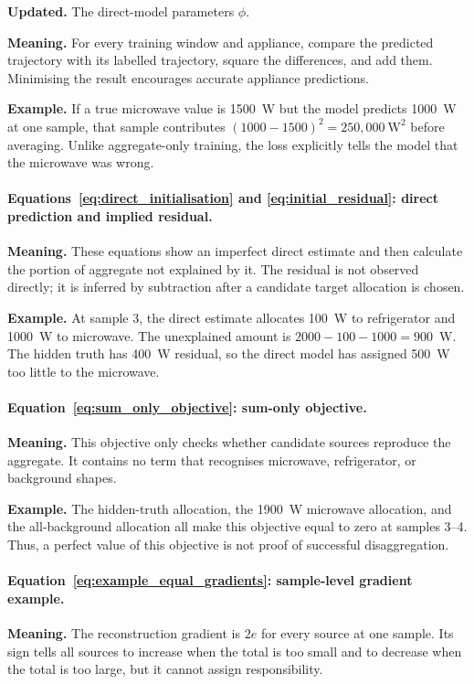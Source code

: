 \documentclass[11pt]{article}
\begin{document}
\textbf{Updated.} The direct-model parameters $\phi$.

\textbf{Meaning.} For every training window and appliance, compare the predicted trajectory with its labelled trajectory, square the differences, and add them. Minimising the result encourages accurate appliance predictions.

\textbf{Example.} If a true microwave value is 1500~W but the model predicts 1000~W at one sample, that sample contributes $(1000-1500)^2=250{,}000\ \mathrm{W}^2$ before averaging. Unlike aggregate-only training, the loss explicitly tells the model that the microwave was wrong.

\paragraph{Equations~\eqref{eq:direct_initialisation} and \eqref{eq:initial_residual}: direct prediction and implied residual.}
\textbf{Meaning.} These equations show an imperfect direct estimate and then calculate the portion of aggregate not explained by it. The residual is not observed directly; it is inferred by subtraction after a candidate target allocation is chosen.

\textbf{Example.} At sample 3, the direct estimate allocates 100~W to refrigerator and 1000~W to microwave. The unexplained amount is $2000-100-1000=900$~W. The hidden truth has 400~W residual, so the direct model has assigned 500~W too little to the microwave.

\paragraph{Equation~\eqref{eq:sum_only_objective}: sum-only objective.}
\textbf{Meaning.} This objective only checks whether candidate sources reproduce the aggregate. It contains no term that recognises microwave, refrigerator, or background shapes.

\textbf{Example.} The hidden-truth allocation, the 1900~W microwave allocation, and the all-background allocation all make this objective equal to zero at samples 3--4. Thus, a perfect value of this objective is not proof of successful disaggregation.

\paragraph{Equation~\eqref{eq:example_equal_gradients}: sample-level gradient example.}
\textbf{Meaning.} The reconstruction gradient is $2e$ for every source at one sample. Its sign tells all sources to increase when the total is too small and to decrease when the total is too large, but it cannot assign responsibility.
\end{document}
